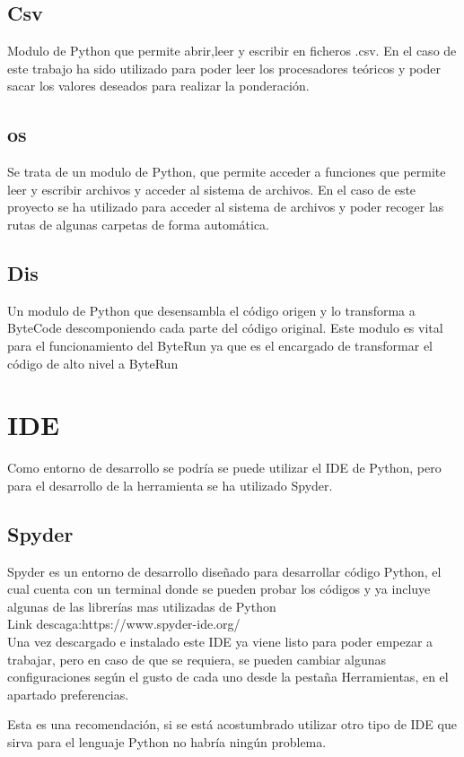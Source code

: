 \subsection{Csv}

Modulo de Python que permite abrir,leer y escribir en ficheros .csv. En el caso de este trabajo ha sido utilizado para poder leer los procesadores teóricos y poder sacar los valores deseados para realizar la ponderación.
 
\subsection{os}
Se trata de un modulo de Python, que permite acceder a funciones que permite leer y escribir archivos y acceder al sistema de archivos. En el caso de este proyecto se ha utilizado para acceder al sistema de archivos y poder recoger las rutas de algunas carpetas de forma automática. 

\subsection{Dis}
Un modulo de Python que desensambla el código origen y lo transforma a ByteCode descomponiendo cada parte del código original. Este modulo es vital para el funcionamiento del ByteRun ya que es el encargado de transformar el código de alto nivel a ByteRun



\section{IDE}

Como entorno de desarrollo se podría se puede utilizar el IDE de Python, pero para el desarrollo de la herramienta se ha utilizado Spyder.

\subsection{Spyder}
Spyder es un entorno de desarrollo diseñado para desarrollar código Python, el cual cuenta con un terminal donde se pueden probar los códigos y ya incluye algunas de las librerías mas utilizadas de Python\\

Link descaga:https://www.spyder-ide.org/\\

Una vez descargado e instalado este IDE ya viene listo para poder empezar a trabajar, pero en caso de que se requiera, se pueden cambiar algunas configuraciones según el gusto de cada uno desde la pestaña Herramientas, en el apartado preferencias.\\


Esta es una recomendación, si se está acostumbrado utilizar otro tipo de IDE que sirva para el lenguaje Python no habría ningún problema.\\

